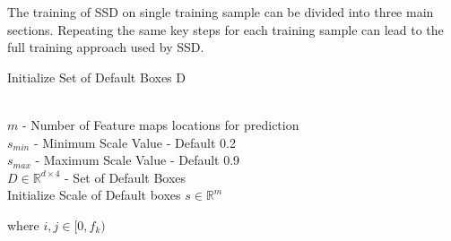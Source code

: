 \documentclass[conference]{IEEEtran}
\begin{document}
The training of SSD on single training sample can be divided into three main sections. Repeating the same key steps for each training sample can lead to the full training approach used by SSD.
\begin{algorithm}
   \caption{Initialize Set of Default Boxes D}
   \label{alg1}
\begin{algorithmic}
   		\\$m$ - Number of Feature maps locations for prediction
        \\$s_{min}$ - Minimum Scale Value - Default 0.2
        \\$s_{max}$ - Maximum Scale Value - Default 0.9
    	\\$D \in \mathbb{R}^{d\times4}$ - Set of Default Boxes
    		\\Initialize Scale of Default boxes $s \in \mathbb{R}^m$
            \ENDFOR
         
                         where $i, j \in [0, f_k)$
                        
                        \ELSE
                        \ENDIF
                \ENDFOR 
            \ENDFOR
\end{algorithmic}
\end{algorithm}
\end{document}

